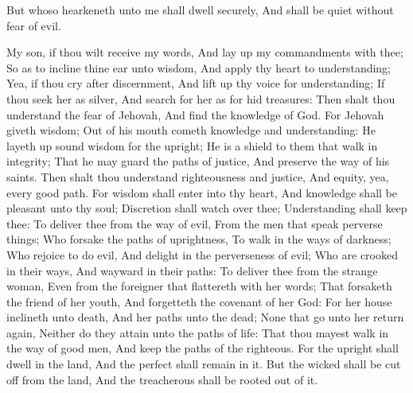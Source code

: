 But whoso hearkeneth unto me shall dwell securely, And shall be quiet without fear of evil. 

My son, if thou wilt receive my words, And lay up my commandments with thee;  So as to incline thine ear unto wisdom, And apply thy heart to understanding;  Yea, if thou cry after discernment, And lift up thy voice for understanding;  If thou seek her as silver, And search for her as for hid treasures:  Then shalt thou understand the fear of Jehovah, And find the knowledge of God.  For Jehovah giveth wisdom; Out of his mouth cometh knowledge and understanding:  He layeth up sound wisdom for the upright; He is a shield to them that walk in integrity;  That he may guard the paths of justice, And preserve the way of his saints.  Then shalt thou understand righteousness and justice, And equity, yea, every good path.  For wisdom shall enter into thy heart, And knowledge shall be pleasant unto thy soul;  Discretion shall watch over thee; Understanding shall keep thee:  To deliver thee from the way of evil, From the men that speak perverse things;  Who forsake the paths of uprightness, To walk in the ways of darkness;  Who rejoice to do evil, And delight in the perverseness of evil;  Who are crooked in their ways, And wayward in their paths:  To deliver thee from the strange woman, Even from the foreigner that flattereth with her words;  That forsaketh the friend of her youth, And forgetteth the covenant of her God:  For her house inclineth unto death, And her paths unto the dead;  None that go unto her return again, Neither do they attain unto the paths of life:  That thou mayest walk in the way of good men, And keep the paths of the righteous.  For the upright shall dwell in the land, And the perfect shall remain in it.  But the wicked shall be cut off from the land, And the treacherous shall be rooted out of it. 

